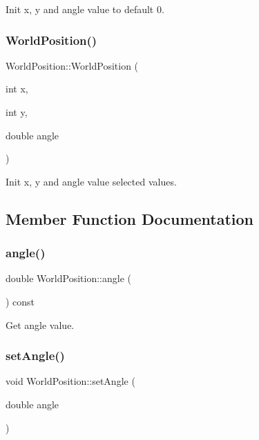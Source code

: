 Init x, y and angle value to default 0. 

\mbox{\label{class_world_position_a7522fc742a5f1fe1111818d7f5e3248c}} 
\subsubsection{\texorpdfstring{WorldPosition()}{WorldPosition()}\hspace{0.1cm}{\footnotesize\ttfamily [2/2]}}
{\footnotesize\ttfamily World\+Position\+::\+World\+Position (\begin{DoxyParamCaption}\item[{int}]{x,  }\item[{int}]{y,  }\item[{double}]{angle }\end{DoxyParamCaption})}



Init x, y and angle value selected values. 



\subsection{Member Function Documentation}
\mbox{\label{class_world_position_af69b8ff7bd453f0e39a6a2deec64ef42}} 
\subsubsection{\texorpdfstring{angle()}{angle()}}
{\footnotesize\ttfamily double World\+Position\+::angle (\begin{DoxyParamCaption}{ }\end{DoxyParamCaption}) const}



Get angle value. 

\mbox{\label{class_world_position_a04fb55b48cf6f02437fe7d70630e464e}} 
\subsubsection{\texorpdfstring{setAngle()}{setAngle()}}
{\footnotesize\ttfamily void World\+Position\+::set\+Angle (\begin{DoxyParamCaption}\item[{double}]{angle }\end{DoxyParamCaption})}



